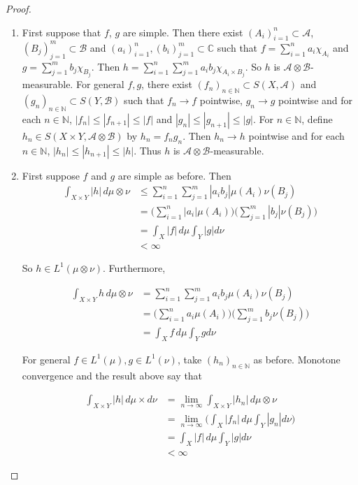 \documentclass[12pt]{amsart}
\theoremstyle{definition}
\newcommand{\C}{\mathbb{C}}
\newcommand{\N}{\mathbb{N}}
\newcommand{\MA}{\mathcal{A}}
\newcommand{\MB}{\mathcal{B}}
\newcommand{\dmu}{\, d \mu}
\newcommand{\limn}{\lim \limits_{n \rightarrow \infty}}
\begin{document}
	\begin{proof}\
		\begin{enumerate}
			\item First suppose that $f$, $g$ are simple. Then there exist $(A_i)_{i=1}^n \subset \MA$, $(B_j)_{j=1}^m \subset \MB$ and $(a_i)_{i=1}^n, (b_i)_{j=1}^m \subset \C$ such that $f = \sum_{i=1}^n a_i \chi_{A_i}$ and $g = \sum_{j=1}^m b_j \chi_{B_j}$. Then $h = \sum_{i=1}^n \sum_{j=1}^m a_i b_j \chi_{A_i \times B_j}$. So $h$ is $\MA \otimes \MB$-measurable. For general $f,g$, there exist $(f_n)_{n \in \N} \subset S(X, \MA)$ and $(g_n)_{n \in \N} \subset S(Y, \MB)$ such that $f_n \rightarrow f$ pointwise, $g_n \rightarrow g$ pointwise and for each $n \in \N$, $|f_n| \leq |f_{n+1}| \leq |f|$ and $|g_n| \leq |g_{n+1}| \leq |g|$. For $n \in \N$, define $h_n \in S(X \times Y, \MA \otimes \MB)$ by $h_n = f_n g_n$. Then $h_n \rightarrow h$ pointwise and for each $n \in \N$, $|h_n| \leq |h_{n+1}| \leq |h|$. Thus $h$ is $\MA \otimes \MB$-measurable.
			
			\item First suppose $f$ and $g$ are simple as before. Then  
			\begin{align*}
				\int_{X \times Y} |h| \dmu \otimes \nu 
				& \leq \sum_{i=1}^n \sum_{j=1}^m |a_i b_j| \mu(A_i) \nu(B_j)\\ 
				&= \big(\sum_{i=1}^n |a_i| \mu(A_i) \big) \big( \sum_{j=1}^m |b_j| \nu(B_j) \big)\\
				&= \int_X |f| \dmu \int_Y |g| d \nu\\
				&< \infty
			\end{align*}
			
			So $h \in L^1(\mu \otimes \nu)$. Furthermore, 
			
			\begin{align*}
				\int_{X \times Y} h \dmu \otimes \nu 
				&= \sum_{i=1}^n \sum_{j=1}^m a_i b_j \mu(A_i) \nu(B_j)\\ 
				&= \big(\sum_{i=1}^n a_i \mu(A_i) \big) \big( \sum_{j=1}^m b_j \nu(B_j) \big)\\
				&= \int_X f \dmu \int_Y gd \nu
			\end{align*}
			
			For general $f \in L^1(\mu), g \in L^1(\nu)$, take $(h_n)_{n \in \N}$ as before. Monotone convergence and the result above say that 
			
			\begin{align*}
				\int_{X \times Y} |h| \dmu \times d\nu 
				&= \limn \int_{X \times Y} |h_n|\dmu \otimes \nu\\
				&=  \limn \bigg( \int_X |f_n| \dmu \int_Y |g_n| d\nu \bigg) \\
				&= \int_X |f| \dmu \int_Y |g| d\nu\\
				& < \infty
			\end{align*}
			

\end{enumerate}
\end{proof}
\end{document}

